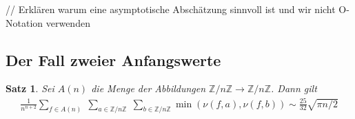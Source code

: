 \documentclass[a4paper, 10pt, ngerman]{article}
\newcommand{\Z}{\mathbb{Z}}
\newtheorem{theorem}{Satz}
\begin{document}
// Erklären warum eine asymptotische Abschätzung sinnvoll ist und wir nicht O-Notation verwenden

\subsection{Der Fall zweier Anfangswerte}

\begin{theorem}
    Sei $A(n)$ die Menge der Abbildungen $\Z/n\Z \to \Z/n\Z$. Dann gilt
    \begin{align*}
        \frac 1 {n^{n + 2}} \sum_{f \in A(n)} \; \sum_{a \in \Z/n\Z} \; \sum_{b \in \Z/n\Z} \min(\nu(f, a), \nu(f, b)) \sim \frac {25} {32} \sqrt{\pi n / 2}
    \end{align*}
\end{theorem}
\end{document}
